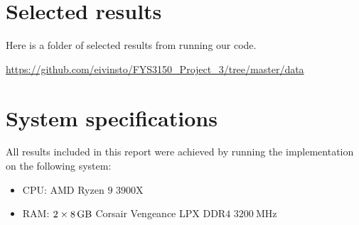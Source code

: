 \documentclass[reprint,english,notitlepage]{revtex4-1}  %
\begin{document}
\newpage
\section{Selected results} \label{B}
Here is a folder of selected results from running our code.

\url{https://github.com/eivinsto/FYS3150_Project_3/tree/master/data}

\newpage
\section{System specifications} \label{C}
All results included in this report were achieved by running the implementation on the following system:
\begin{itemize}
	\item CPU: AMD Ryzen \(9\) \(3900\)X
	\item RAM: \(2\times\SI{8}{\giga\byte}\) Corsair Vengeance LPX DDR\(4\) \(\SI{3200}{\mega\hertz}\)
\end{itemize}
\end{document}

